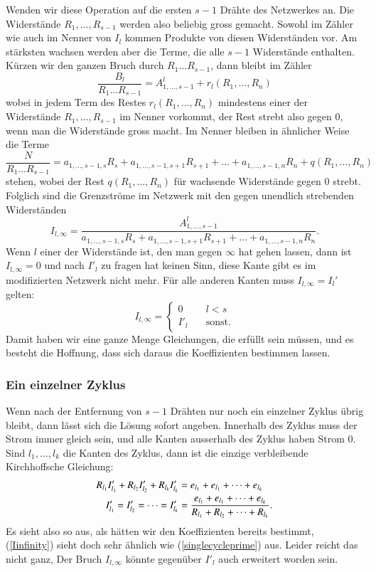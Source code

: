 Wenden wir diese Operation auf die ersten $s-1$ Drähte des Netzwerkes
an. Die Widerstände $R_1,\dots,R_{s-1}$ werden also beliebig gross gemacht.
Sowohl im Zähler wie auch im Nenner von $I_l$ kommen Produkte von diesen
Widerständen vor. Am stärksten wachsen werden aber die Terme, die
alle $s-1$ Widerstände enthalten. Kürzen wir den ganzen Bruch durch
$R_1\dots R_{s-1}$, dann bleibt im Zähler
\[
\frac{B_l}{R_1\dots R_{s-1}}=
A_{1,\dots,s-1}^l+r_l(R_1,\dots,R_n)
\]
wobei in jedem Term des Restes $r_l(R_1,\dots,R_n)$ mindestens einer
der Widerstände $R_1,\dots,R_{s-1}$ im Nenner vorkommt, der Rest
strebt also gegen $0$, wenn man die Widerstände gross macht.
Im Nenner bleiben in ähnlicher Weise die Terme
\[
\frac{N}{R_1\dots R_{s-1}}=
a_{1,\dots,s-1,s}R_s+a_{1,\dots,s-1,s+1}R_{s+1}+\dots+a_{1,\dots,s-1,n}R_n
+q(R_1,\dots,R_n)
\]
stehen, wobei der Rest $q(R_1,\dots,R_n)$ für wachsende Widerstände
gegen $0$ strebt. Folglich sind die Grenzströme im Netzwerk mit den
gegen unendlich strebenden Widerständen
\begin{equation}
I_{l,\infty}=
\frac{A_{1,\dots,s-1}^l}{a_{1,\dots,s-1,s}R_s+a_{1,\dots,s-1,s+1}R_{s+1}+\dots+a_{1,\dots,s-1,n}R_n}.
\label{Iinfinity}
\end{equation}
Wenn $l$ einer der Widerstände ist, den man gegen $\infty$ hat gehen lassen,
dann ist $I_{l,\infty}=0$ und nach $I'_l$ zu fragen hat keinen Sinn, diese
Kante gibt es im modifizierten Netzwerk nicht mehr. Für alle anderen 
Kanten muss $I_{l,\infty}=I_l'$ gelten:
\begin{equation}
I_{l,\infty}=
\begin{cases}
0&\quad l< s\\
I'_l&\quad\text{sonst}.
\end{cases}
\label{Iequations}
\end{equation}
Damit haben wir eine ganze Menge Gleichungen, die erfüllt sein
müssen, und es besteht die Hoffnung, dass sich daraus die Koeffizienten
bestimmen lassen.

\subsubsection{Ein einzelner Zyklus}
Wenn nach der Entfernung von $s-1$ Drähten nur noch ein einzelner
Zyklus übrig bleibt, dann lässt sich die Lösung sofort angeben.
Innerhalb des Zyklus muss der Strom immer gleich sein, und alle
Kanten ausserhalb des Zyklus haben Strom $0$. Sind $l_1,\dots,l_k$
die Kanten des Zyklus, dann ist die einzige verbleibende Kirchhoffsche
Gleichung:
\begin{align}
R_{l_1}I_{l_1}'+R_{l_2}I_{l_2}'+R_{l_k}I_{l_k}'&=e_{l_1}+e_{l_1}+\dots+e_{l_k}
\notag
\\
I_{l_1}'=I_{l_2}'=\dots=I_{l_k}'&=\frac{e_{l_1}+e_{l_1}+\dots+e_{l_k}}{R_{l_1}+R_{l_2}+\dots+R_{l_k}}.
\label{singlecycleprime}
\end{align}
Es sieht also so aus, als hätten wir den Koeffizienten bereits
bestimmt, (\ref{Iinfinity}) sieht doch sehr ähnlich wie
(\ref{singlecycleprime}) aus. Leider reicht das nicht ganz, Der Bruch
$I_{l,\infty}$ könnte gegenüber $I'_l$ auch erweitert worden sein.


